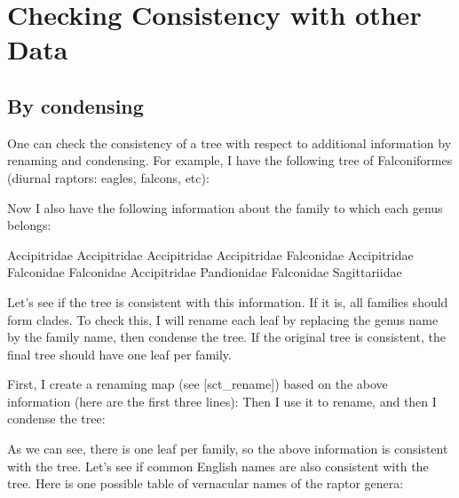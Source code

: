 
\section[sct_check_consistency]{Checking Consistency with other Data}


\subsection{By condensing}

One can check the consistency of a tree with respect to additional information
by renaming and condensing. For example, I have the following tree of
Falconiformes (diurnal raptors: eagles, falcons, etc):


Now I also have the following information about the family to which each genus belongs:

\starttabulate[|l|l|]
  \NC\NR
\NC {} \NC Accipitridae \NC\NR
\NC {} \NC Accipitridae \NC\NR
\NC {} \NC Accipitridae \NC\NR
\NC {} \NC Accipitridae \NC\NR
\NC {} \NC Falconidae \NC\NR
\NC {} \NC Accipitridae \NC\NR
\NC {} \NC Falconidae \NC\NR
\NC {} \NC Falconidae \NC\NR
\NC {} \NC Accipitridae \NC\NR
\NC {} \NC Pandionidae \NC\NR
\NC {} \NC Falconidae \NC\NR
\NC {} \NC Sagittariidae
\stoptabulate

Let's see if the tree is consistent with this information. If it is, all
families should form clades. To check this, I will rename each leaf by replacing
the genus name by the family name, then condense the tree. If the original tree
is consistent, the final tree should have one leaf per family.

First, I create a renaming map (see \in{}[sct_rename]) based on the above
information (here are the first three lines):
Then I use it to rename, and then I condense the tree:


As we can see, there is one leaf per family, so the above information is
consistent with the tree.  Let's see if common English names are also consistent
with the tree. Here is one possible table of vernacular names of the raptor
genera: 

